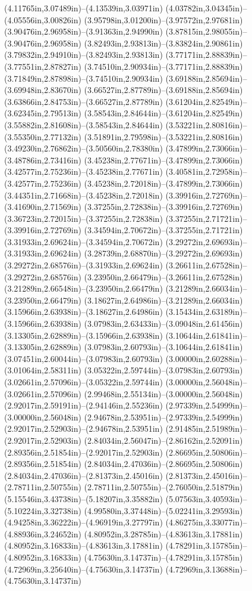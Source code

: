 (4.11765in,3.07489in)--(4.13539in,3.03971in) (4.03782in,3.04345in)--(4.05556in,3.00826in) (3.95798in,3.01200in)--(3.97572in,2.97681in) (3.90476in,2.96958in)--(3.91363in,2.94990in) (3.87815in,2.98055in)--(3.90476in,2.96958in) (3.82493in,2.93813in)--(3.83824in,2.90861in) (3.79832in,2.94910in)--(3.82493in,2.93813in) (3.77171in,2.88839in)--(3.77551in,2.87827in) (3.74510in,2.90934in)--(3.77171in,2.88839in) (3.71849in,2.87898in)--(3.74510in,2.90934in) (3.69188in,2.85694in)--(3.69948in,2.83670in) (3.66527in,2.87789in)--(3.69188in,2.85694in) (3.63866in,2.84753in)--(3.66527in,2.87789in) (3.61204in,2.82549in)--(3.62345in,2.79513in) (3.58543in,2.84644in)--(3.61204in,2.82549in) (3.55882in,2.81608in)--(3.58543in,2.84644in) (3.53221in,2.80816in)--(3.55350in,2.77132in) (3.51891in,2.79598in)--(3.53221in,2.80816in) (3.49230in,2.76862in)--(3.50560in,2.78380in) (3.47899in,2.73066in)--(3.48786in,2.73416in) (3.45238in,2.77671in)--(3.47899in,2.73066in) (3.42577in,2.75236in)--(3.45238in,2.77671in) (3.40581in,2.72958in)--(3.42577in,2.75236in) (3.45238in,2.72018in)--(3.47899in,2.73066in) (3.44351in,2.71668in)--(3.45238in,2.72018in) (3.39916in,2.72769in)--(3.41690in,2.71569in) (3.37255in,2.72838in)--(3.39916in,2.72769in) (3.36723in,2.72015in)--(3.37255in,2.72838in) (3.37255in,2.71721in)--(3.39916in,2.72769in) (3.34594in,2.70672in)--(3.37255in,2.71721in) (3.31933in,2.69624in)--(3.34594in,2.70672in) (3.29272in,2.69693in)--(3.31933in,2.69624in) (3.28739in,2.68870in)--(3.29272in,2.69693in) (3.29272in,2.68576in)--(3.31933in,2.69624in) (3.26611in,2.67528in)--(3.29272in,2.68576in) (3.23950in,2.66479in)--(3.26611in,2.67528in) (3.21289in,2.66548in)--(3.23950in,2.66479in) (3.21289in,2.66034in)--(3.23950in,2.66479in) (3.18627in,2.64986in)--(3.21289in,2.66034in) (3.15966in,2.63938in)--(3.18627in,2.64986in) (3.15434in,2.63189in)--(3.15966in,2.63938in) (3.07983in,2.63433in)--(3.09048in,2.61456in) (3.13305in,2.62889in)--(3.15966in,2.63938in) (3.10644in,2.61841in)--(3.13305in,2.62889in) (3.07983in,2.60793in)--(3.10644in,2.61841in) (3.07451in,2.60044in)--(3.07983in,2.60793in) (3.00000in,2.60288in)--(3.01064in,2.58311in) (3.05322in,2.59744in)--(3.07983in,2.60793in) (3.02661in,2.57096in)--(3.05322in,2.59744in) (3.00000in,2.56048in)--(3.02661in,2.57096in) (2.99468in,2.55134in)--(3.00000in,2.56048in) (2.92017in,2.59191in)--(2.94146in,2.55236in) (2.97339in,2.54999in)--(3.00000in,2.56048in) (2.94678in,2.53951in)--(2.97339in,2.54999in) (2.92017in,2.52903in)--(2.94678in,2.53951in) (2.91485in,2.51989in)--(2.92017in,2.52903in) (2.84034in,2.56047in)--(2.86162in,2.52091in) (2.89356in,2.51854in)--(2.92017in,2.52903in) (2.86695in,2.50806in)--(2.89356in,2.51854in) (2.84034in,2.47036in)--(2.86695in,2.50806in) (2.84034in,2.47036in)--(2.81373in,2.45016in) (2.81373in,2.45016in)--(2.78711in,2.50755in) (2.78711in,2.50755in)--(2.76050in,2.51879in) (5.15546in,3.43738in)--(5.18207in,3.35882in) (5.07563in,3.40593in)--(5.10224in,3.32738in) (4.99580in,3.37448in)--(5.02241in,3.29593in) (4.94258in,3.36222in)--(4.96919in,3.27797in) (4.86275in,3.33077in)--(4.88936in,3.24652in) (4.80952in,3.28785in)--(4.83613in,3.17881in) (4.80952in,3.16833in)--(4.83613in,3.17881in) (4.78291in,3.15785in)--(4.80952in,3.16833in) (4.75630in,3.14737in)--(4.78291in,3.15785in) (4.72969in,3.25640in)--(4.75630in,3.14737in) (4.72969in,3.13688in)--(4.75630in,3.14737in) 